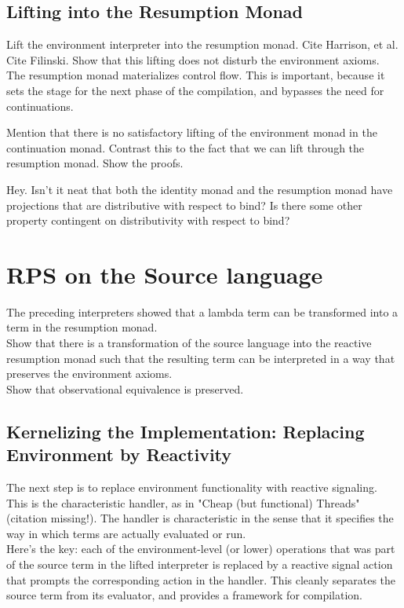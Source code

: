 \documentclass{article}
\begin{document}
\subsection{Lifting into the Resumption Monad}

Lift the environment interpreter into the resumption monad.  Cite Harrison, et al.  Cite Filinski.  Show that this lifting does not disturb the environment axioms.  The resumption monad materializes control flow.  This is important, because it sets the stage for the next phase of the compilation, and bypasses the need for continuations.

Mention that there is no satisfactory lifting of the environment monad in the continuation monad.  Contrast this to the fact that we can lift through the resumption monad.  Show the proofs.

Hey.  Isn't it neat that both the identity monad and the resumption monad have projections that are distributive with respect to bind?  Is there some other property contingent on distributivity with respect to bind?

\section{RPS on the Source language}

The preceding interpreters showed that a lambda term can be transformed into a term in the resumption monad.\\

Show that there is a transformation of the source language into the reactive resumption monad such that the resulting term can be interpreted in a way that preserves the environment axioms.\\

Show that observational equivalence is preserved.

\subsection{Kernelizing the Implementation: Replacing Environment by Reactivity}

The next step is to replace environment functionality with reactive signaling.  This is the characteristic handler, as in "Cheap (but functional) Threads" (citation missing!).  The handler is characteristic in the sense that it specifies the way in which terms are actually evaluated or run.\\

Here's the key: each of the environment-level (or lower) operations that was part of the source term in the lifted interpreter is replaced by a reactive signal action that prompts the corresponding action in the handler.  This cleanly separates the source term from its evaluator, and provides a framework for compilation.
\end{document}
